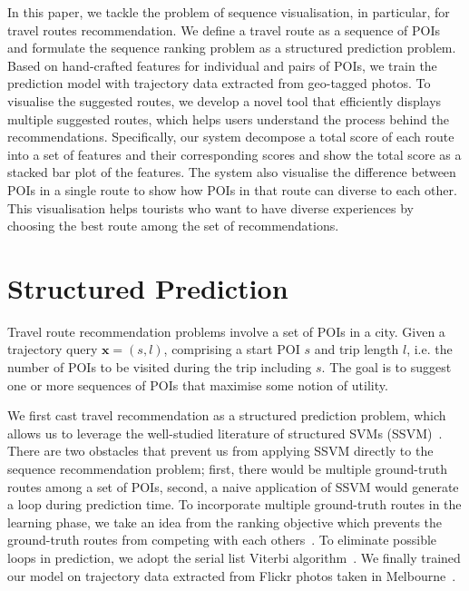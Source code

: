 \documentclass[sigconf]{acmart}
\begin{document}
In this paper, we tackle the problem of sequence visualisation, in particular, for travel routes recommendation. 
We define a travel route as a sequence of POIs and formulate the sequence ranking problem as a structured prediction problem. 
Based on hand-crafted features for individual and pairs of POIs, we train the prediction model with trajectory data extracted from geo-tagged photos. 
To visualise the suggested routes, we develop a novel tool that efficiently displays multiple suggested routes, which helps users understand the process behind the recommendations.
Specifically, our system decompose a total score of each route into a set of features and their corresponding scores and show the total score as a stacked bar plot of the features.
The system also visualise the difference between POIs in a single route to show how POIs in that route can diverse to each other. 
This visualisation helps tourists who want to have diverse experiences by choosing the best route among the set of recommendations.

\section{Structured Prediction}
Travel route recommendation problems involve a set of POIs in a city. 
Given a trajectory query $\mathbf{x} = (s, l)$, comprising a start POI $s$ and trip length $l$, i.e. the number of POIs to be visited during the trip including $s$.
The goal is to suggest one or more sequences of POIs that maximise some notion of utility.

We first cast travel recommendation as a structured prediction problem, which allows us to leverage the well-studied literature of structured SVMs (SSVM)~\cite{tsochantaridis2005large,joachims2009predicting}. 
There are two obstacles that prevent us from applying SSVM directly to the sequence recommendation problem; first, there would be multiple ground-truth routes among a set of POIs, second, a naive application of SSVM would generate a loop during prediction time. 
To incorporate multiple ground-truth routes in the learning phase, we take an idea from the ranking objective which prevents the ground-truth routes from competing with each others~\cite{rendle2009bpr}. 
To eliminate possible loops in prediction, we adopt the serial list Viterbi algorithm~\cite{seshadri1994list,nill1995list,nilsson2001sequentially}.
We finally trained our model on trajectory data extracted from Flickr photos taken in Melbourne~\cite{chen2016learning}.
\end{document}
